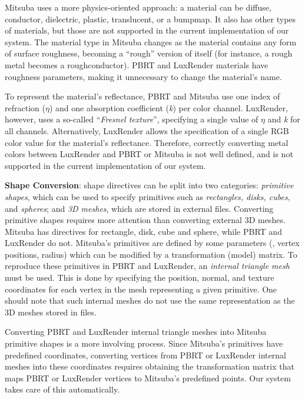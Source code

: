 Mitsuba uses a more physics-oriented approach: a material can be diffuse,
conductor, dielectric, plastic, translucent, or a bumpmap.
It also has other types of materials, but those are not supported in the current implementation of our system.
The material type in Mitsuba changes as the material contains any form of
surface roughness, becoming a ``rough'' version of itself (for instance, a rough
metal becomes a roughconductor).
%
PBRT and LuxRender materials have roughness parameters, making it unnecessary to
change the material's name.

To represent the material's reflectance, PBRT and Mitsuba use one index of refraction ($\eta$) and one absorption 
coefficient (\textit{k}) per color channel. 
LuxRender, however, uses a so-called ``{\it Fresnel texture}'', specifying a 
single value of $\eta$ and \textit{k} for all channels. Alternatively, LuxRender allows the specification of a single RGB 
color value for the material's reflectance. Therefore, correctly converting metal colors between LuxRender and PBRT or Mitsuba is not well defined, 
and is not supported in the current implementation of our system.

\textbf{Shape Conversion}: 
shape directives can be split into two categories: {\it primitive shapes}, which can
be used to specify primitives such as {\it rectangles, disks, cubes}, and {\it spheres};
and {\it 3D meshes}, which are stored in external files. 
%
Converting primitive shapes requires more attention than converting external 3D meshes. 
Mitsuba has directives for rectangle, disk, cube and sphere, while PBRT and LuxRender do not. 
Mitsuba's primitives are defined by some parameters (\eg, vertex positions, radius) which can be modified by 
a transformation (model) matrix. To reproduce these primitives in PBRT and 
LuxRender, an {\it internal triangle mesh} must be used. This is done by specifying the position, normal, and texture coordinates for each vertex in the mesh representing a given primitive. One should note that such internal meshes do not use the same representation as the 3D meshes stored in files.

Converting PBRT and LuxRender internal triangle meshes into Mitsuba primitive shapes is a more involving process. Since Mitsuba's 
primitives have predefined coordinates, converting vertices from PBRT or LuxRender internal meshes into 
these coordinates requires obtaining the transformation matrix that maps PBRT or LuxRender vertices 
to Mitsuba's predefined points. Our system takes care of this automatically.

